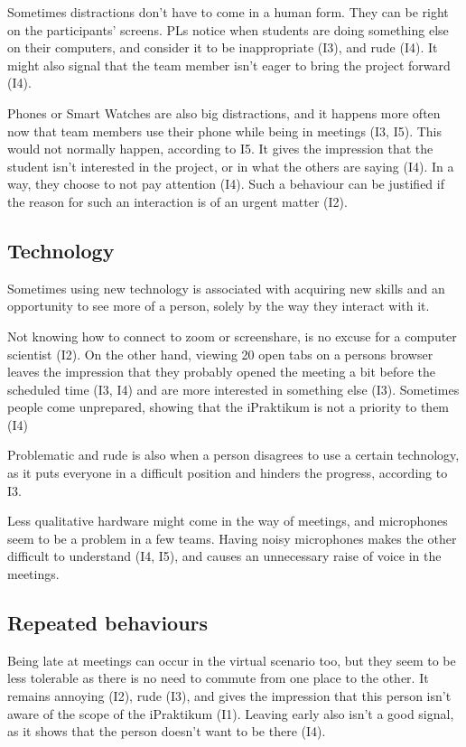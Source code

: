 Sometimes distractions don't have to come in a human form. They can be right on the participants' screens. PLs notice when students are doing something else on their computers, and consider it to be inappropriate (I3), and rude (I4). It might also signal that the team member isn't eager to bring the project forward (I4).

Phones or Smart Watches are also big distractions, and it happens more often now that team members use their phone while being in meetings (I3, I5). This would not normally happen, according to I5. It gives the impression that the student isn't interested in the project, or in what the others are saying (I4). In a way, they choose to not pay attention (I4). Such a behaviour can be justified if the reason for such an interaction is of an urgent matter (I2). 

\subsection{Technology}

Sometimes using new technology is associated with acquiring new skills  and an opportunity to see more of a person, solely by the way they interact with it.

Not knowing how to connect to zoom or screenshare, is no excuse for a computer scientist (I2). On the other hand, viewing 20 open tabs on a persons browser leaves the impression that they probably opened the meeting a bit before the scheduled time (I3, I4) and are more interested in something else (I3). Sometimes people come unprepared, showing that the iPraktikum is not a priority to them (I4)

Problematic and rude is also when a person disagrees to use a certain technology, as it puts everyone in a difficult position and hinders the progress, according to I3. 

Less qualitative hardware might come in the way of meetings, and microphones seem to be a problem in a few teams. Having noisy microphones makes the other difficult to understand (I4, I5), and causes an unnecessary raise of voice in the meetings.

\subsection{Repeated behaviours}

Being late at meetings can occur in the virtual scenario too, but they seem to be less tolerable as there is no need to commute from one place to the other. It remains annoying (I2), rude (I3), and gives the impression that this person isn't aware of the scope of the iPraktikum (I1). Leaving early also isn't a good signal, as it shows that the person doesn't want to be there (I4).

